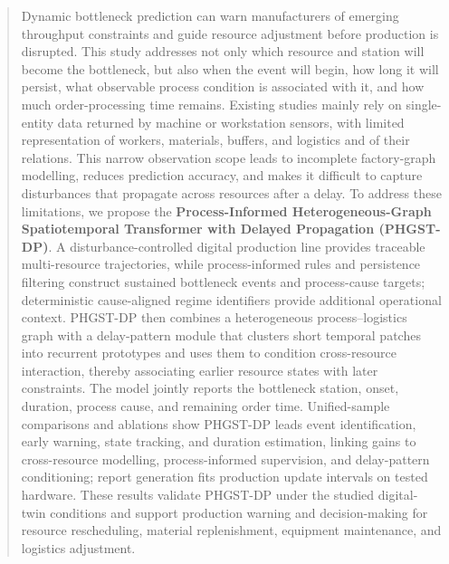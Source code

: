 \documentclass[a4paper,fleqn]{cas-dc}
\begin{document}
\begin{abstract}
Dynamic bottleneck prediction can warn manufacturers of emerging throughput constraints and guide resource adjustment before production is disrupted.
This study addresses not only which resource and station will become the bottleneck, but also when the event will begin, how long it will persist, what observable process condition is associated with it, and how much order-processing time remains.
Existing studies mainly rely on single-entity data returned by machine or workstation sensors, with limited representation of workers, materials, buffers, and logistics and of their relations.
This narrow observation scope leads to incomplete factory-graph modelling, reduces prediction accuracy, and makes it difficult to capture disturbances that propagate across resources after a delay.
To address these limitations, we propose the \textbf{Process-Informed Heterogeneous-Graph Spatiotemporal Transformer with Delayed Propagation (PHGST-DP)}.
A disturbance-controlled digital production line provides traceable multi-resource trajectories, while process-informed rules and persistence filtering construct sustained bottleneck events and process-cause targets; deterministic cause-aligned regime identifiers provide additional operational context.
PHGST-DP then combines a heterogeneous process--logistics graph with a delay-pattern module that clusters short temporal patches into recurrent prototypes and uses them to condition cross-resource interaction, thereby associating earlier resource states with later constraints.
The model jointly reports the bottleneck station, onset, duration, process cause, and remaining order time.
Unified-sample comparisons and ablations show PHGST-DP leads event identification, early warning, state tracking, and duration estimation, linking gains to cross-resource modelling, process-informed supervision, and delay-pattern conditioning; report generation fits production update intervals on tested hardware.
These results validate PHGST-DP under the studied digital-twin conditions and support production warning and decision-making for resource rescheduling, material replenishment, equipment maintenance, and logistics adjustment.


\end{abstract}
\end{document}
